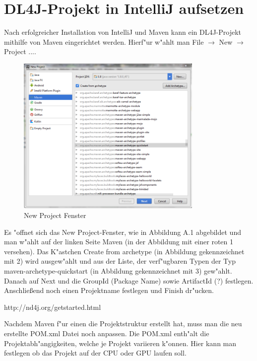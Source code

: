 \chapter{DL4J-Projekt in IntelliJ aufsetzen}
{
Nach erfolgreicher Installation von IntelliJ und Maven kann ein DL4J-Projekt mithilfe von Maven eingerichtet werden. Hierf"ur w"ahlt man \glqq File\grqq{} $\rightarrow$ \glqq New\grqq{} $\rightarrow$ \glqq Project ...\grqq . 
\renewcommand{\figurename}{Abb.}
\begin{figure}[htp]
\centering
\includegraphics[width=0.80\textwidth]{pictures/mavenProj.png}
\caption[\glqq New Project\grqq{} Fenster]{\glqq New Project\grqq{} Fenster}
\end{figure}
Es "offnet sich das \glqq New Project\grqq -Fenster, wie in Abbildung A.1 abgebildet und man w"ahlt auf der linken Seite \glqq Maven\grqq{} (in der Abbildung mit einer roten 1 versehen). Das K"astchen \glqq Create from archetype\grqq{} (in Abbildung gekennzeichnet mit 2) wird ausgew"ahlt und aus der Liste, der verf"ugbaren Typen der Typ \glqq maven-archetype-quickstart\grqq{} (in Abbildung gekennzeichnet mit 3) gew"ahlt. Danach auf \glqq Next\grqq{}  und die GroupId (Package Name) sowie ArtifactId (?) festlegen. Anschlie{\ss}end noch einen Projektname festlegen und \glqq Finish\grqq{} dr"ucken.

http://nd4j.org/getstarted.html

Nachdem Maven f"ur einen die Projektstruktur erstellt hat, muss man die neu erstellte POM.xml Datei noch anpassen. Die POM.xml enth"alt die Projektabh"angigkeiten, welche je Projekt variieren k"onnen. Hier kann man festlegen ob das Projekt auf der CPU oder GPU laufen soll.


}
